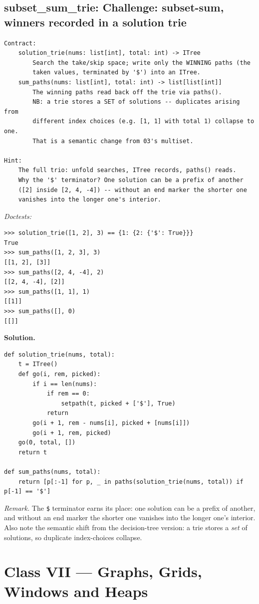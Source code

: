 \documentclass[11pt,letterpaper]{book}
\begin{document}
\section{subset\_sum\_trie: Challenge: subset-sum, winners recorded in a solution trie}
\begin{lstlisting}[style=spec]
Contract:
    solution_trie(nums: list[int], total: int) -> ITree
        Search the take/skip space; write only the WINNING paths (the
        taken values, terminated by '$') into an ITree.
    sum_paths(nums: list[int], total: int) -> list[list[int]]
        The winning paths read back off the trie via paths().
        NB: a trie stores a SET of solutions -- duplicates arising from
        different index choices (e.g. [1, 1] with total 1) collapse to one.
        That is a semantic change from 03's multiset.

Hint:
    The full trio: unfold searches, ITree records, paths() reads.
    Why the '$' terminator? One solution can be a prefix of another
    ([2] inside [2, 4, -4]) -- without an end marker the shorter one
    vanishes into the longer one's interior.
\end{lstlisting}
\noindent\textit{Doctests:}
\begin{lstlisting}[style=spec]
>>> solution_trie([1, 2], 3) == {1: {2: {'$': True}}}
True
>>> sum_paths([1, 2, 3], 3)
[[1, 2], [3]]
>>> sum_paths([2, 4, -4], 2)
[[2, 4, -4], [2]]
>>> sum_paths([1, 1], 1)
[[1]]
>>> sum_paths([], 0)
[[]]
\end{lstlisting}
\noindent\textbf{Solution.}
\begin{lstlisting}[style=code]
def solution_trie(nums, total):
    t = ITree()
    def go(i, rem, picked):
        if i == len(nums):
            if rem == 0:
                setpath(t, picked + ['$'], True)
            return
        go(i + 1, rem - nums[i], picked + [nums[i]])
        go(i + 1, rem, picked)
    go(0, total, [])
    return t

def sum_paths(nums, total):
    return [p[:-1] for p, _ in paths(solution_trie(nums, total)) if p[-1] == '$']
\end{lstlisting}

\noindent\textit{Remark.} The \texttt{\$} terminator earns its place: one
solution can be a prefix of another, and without an end marker the shorter one
vanishes into the longer one's interior. Also note the semantic shift from the
decision-tree version: a trie stores a \emph{set} of solutions, so duplicate
index-choices collapse.
\chapter{Class VII --- Graphs, Grids, Windows and Heaps}
\end{document}
